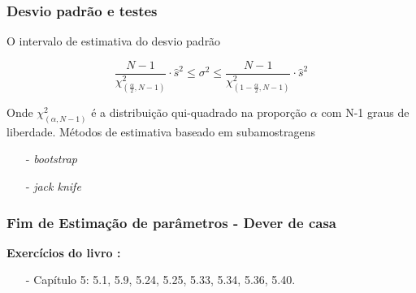 \documentclass[graphics,14pt]{beamer}
\begin{document}
\begin{frame}[t,fragile=singleslide]
\frametitle{Desvio padrão e testes }
	O intervalo de estimativa do desvio padrão 
	
	\begin{equation*}
	\frac{N-1}{\chi^2_{(\frac{\alpha}{2},N-1)}} \cdot \hat{s}^2 \leq \sigma^2 \leq \frac{N-1}{ \chi^2_{(1- \frac{\alpha}{2},N-1)}} \cdot \hat{s}^2
	\end{equation*}
	
	Onde $\chi^2_{(\alpha,N-1)}$ é a distribuição qui-quadrado na proporção $\alpha$ com N-1 graus de liberdade.
	\vspace{2cm}	
	Métodos de estimativa baseado em subamostragens
	\begin{itemize}
		\item[-] \textit{bootstrap}
		\item[-] \textit{jack knife}
	\end{itemize}
\end{frame}
\begin{frame}[t,fragile=singleslide]
\frametitle{Fim de Estimação de parâmetros - Dever de casa}
\textbf{Exercícios do livro \cite{Agresti2018}:}
\begin{itemize}
	\item[-] Capítulo 5: 5.1, 5.9, 5.24, 5.25, 5.33, 5.34, 5.36, 5.40.
\end{itemize}
\end{frame}
\end{document}
